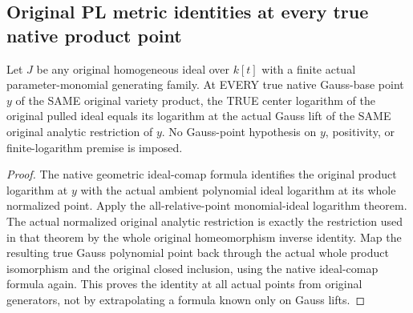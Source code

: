 \subsection{Original PL metric identities at every true native product point}

\begin{theorem}
\label{local:actual-native-product-monomial-log-restriction}
\leanok
{}
Let $J$ be any original homogeneous ideal over $k[t]$ with a finite actual
parameter-monomial generating family. At EVERY true native Gauss-base
point $y$ of the SAME original variety product, the TRUE center logarithm
of the original pulled ideal equals its logarithm at the actual Gauss
lift of the SAME original analytic restriction of $y$. No Gauss-point
hypothesis on $y$, positivity, or finite-logarithm premise is imposed.
\end{theorem}
\begin{proof}
The native geometric ideal-comap formula identifies the original product
logarithm at $y$ with the actual ambient polynomial ideal logarithm at
its whole normalized point. Apply the all-relative-point monomial-ideal
logarithm theorem. The actual normalized original analytic restriction
is exactly the restriction used in that theorem by the whole original
homeomorphism inverse identity. Map the resulting true Gauss polynomial
point back through the actual whole product isomorphism and the original
closed inclusion, using the native ideal-comap formula again. This proves
the identity at all actual points from original generators, not by
extrapolating a formula known only on Gauss lifts.
\end{proof}


